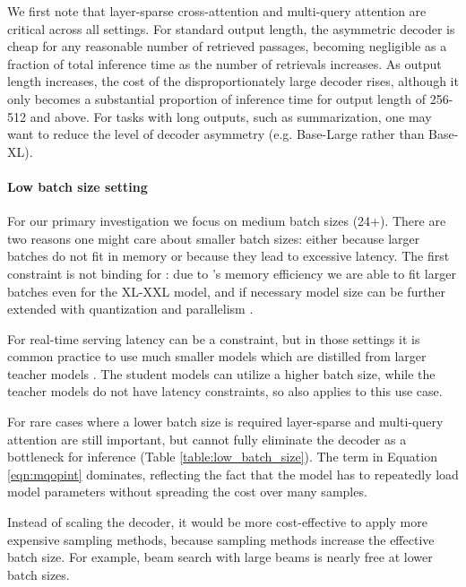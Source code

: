 We first note that layer-sparse cross-attention and multi-query attention are critical across all settings. For standard output length, the asymmetric decoder is cheap for any reasonable number of retrieved passages, becoming negligible as a fraction of total inference time as the number of retrievals increases. As output length increases, the cost of the disproportionately large decoder rises, although it only becomes a substantial proportion of inference time for output length of 256-512 and above. For tasks with long outputs, such as summarization, one may want to reduce the level of decoder asymmetry (e.g. Base-Large rather than Base-XL).



\paragraph{Low batch size setting}

For our primary investigation we focus on medium batch sizes (24+). There are two reasons one might care about smaller batch sizes: either because larger batches do not fit in memory or because they lead to excessive latency. The first constraint is not binding for \modelname: due to \modelname's memory efficiency we are able to fit larger batches even for the XL-XXL model, and if necessary model size can be further extended with quantization \citep{glm} and parallelism \citep{palminference}. 

For real-time serving latency can be a constraint, but in those settings it is common practice to use much smaller models which are distilled from larger teacher models \citep{distillsurvey}. The student models can utilize a higher batch size, while the teacher models do not have latency constraints, so \modelname also applies to this use case.

For rare cases where a lower batch size is required layer-sparse and multi-query attention are still important, but cannot fully eliminate the decoder as a bottleneck for inference (Table \ref{table:low_batch_size}). The  term in Equation \ref{eqn:mqopint} dominates, reflecting the fact that the model has to repeatedly load model parameters without spreading the cost over many samples.

Instead of scaling the decoder, it would be more cost-effective to apply more expensive sampling methods, because sampling methods increase the effective batch size. For example, beam search with large beams is nearly free at lower batch sizes.

